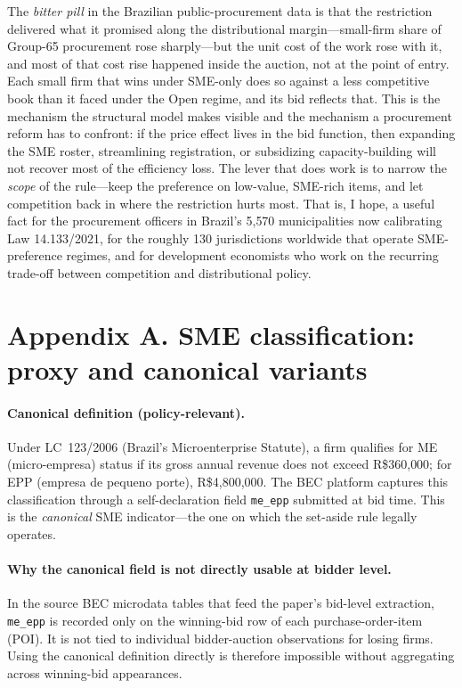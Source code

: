 \documentclass[12pt]{article}
\begin{document}
The \emph{bitter pill} in the Brazilian public-procurement data is
that the restriction delivered what it promised along the
distributional margin---small-firm share of Group-65 procurement
rose sharply---but the unit cost of the work rose with it, and
most of that cost rise happened inside the auction, not at the
point of entry. Each small firm that wins under SME-only does so
against a less competitive book than it faced under the Open
regime, and its bid reflects that. This is the mechanism the
structural model makes visible and the mechanism a procurement
reform has to confront: if the price effect lives in the bid
function, then expanding the SME roster, streamlining registration,
or subsidizing capacity-building will not recover most of the
efficiency loss. The lever that does work is to narrow the
\emph{scope} of the rule---keep the preference on low-value,
SME-rich items, and let competition back in where the restriction
hurts most. That is, I hope, a useful fact for the procurement
officers in Brazil's 5{,}570 municipalities now calibrating Law
14.133/2021, for the roughly 130 jurisdictions worldwide that
operate SME-preference regimes, and for development economists
who work on the recurring trade-off between competition and
distributional policy.

\clearpage



\clearpage
\appendix
\section*{Appendix A. SME classification: proxy and canonical variants}

\paragraph{Canonical definition (policy-relevant).}
Under LC~123/2006 (Brazil's Microenterprise Statute), a firm qualifies
for ME (micro-empresa) status if its gross annual revenue does not
exceed R\$360{,}000; for EPP (empresa de pequeno porte), R\$4{,}800{,}000.
The BEC platform captures this classification through a self-declaration
field \texttt{me\_epp} submitted at bid time. This is the
\emph{canonical} SME indicator---the one on which the set-aside rule
legally operates.

\paragraph{Why the canonical field is not directly usable at bidder level.}
In the source BEC microdata tables that feed the paper's bid-level
extraction, \texttt{me\_epp} is recorded only on the winning-bid row
of each purchase-order-item (POI). It is not tied to individual
bidder-auction observations for losing firms. Using the canonical
definition directly is therefore impossible without aggregating across
winning-bid appearances.
\end{document}
